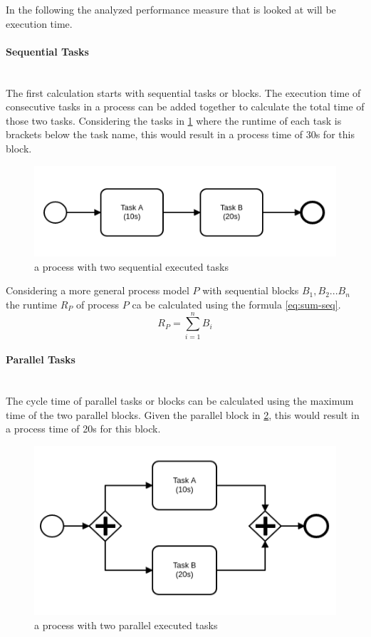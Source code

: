 In the following the analyzed performance measure that is looked at will be execution time. 
\paragraph{Sequential Tasks}~\\
The first calculation starts with sequential tasks or blocks. The execution time of consecutive tasks in a process can be added together to calculate the total time of those two tasks. 
Considering the tasks in \ref{fig:sequential-tasks} where the runtime of each task is brackets below the task name, this would result in a process time of 30s for this block. \cite{ha2006approximate} \cite{fundamentals}

\begin{figure}[H]
	\centering
	\includegraphics[width=0.5\columnwidth]{graphics/sequential-tasks}
	\caption{a process with two sequential executed tasks} 
	\label{fig:sequential-tasks} 
\end{figure}

Considering a more general process model $P$ with sequential blocks $B_1,B_2 ... B_n$ the runtime $R_P$ of process $P$ ca be calculated using the formula \ref{eq:sum-seq}. 
\begin{equation}\label{eq:sum-seq}
	R_P = \displaystyle\sum_{i=1}^{n} B_i
\end{equation}

\paragraph{Parallel Tasks}~\\
The cycle time of parallel tasks or blocks can be calculated using the maximum time of the two parallel blocks. Given the parallel block in \ref{fig:parallel-tasks}, this would result in a process time of 20s for this block.\cite{fundamentals}
\begin{figure}[H]
	\centering
	\includegraphics[width=0.5\columnwidth]{graphics/paralell-tasks}
	\caption{a process with two parallel executed tasks} 
	\label{fig:parallel-tasks} 
\end{figure}

